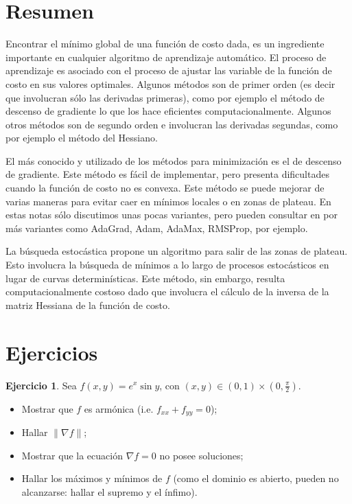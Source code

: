 \documentclass[12pt, a4paper]{amsbook}
\theoremstyle{remark}
\theoremstyle{definition}
\newtheorem{ejer}[teo]{Ejercicio}
\numberwithin{section}{chapter}
\numberwithin{subsection}{section}
\numberwithin{equation}{section}
\numberwithin{figure}{chapter}
\begin{document}
\section{Resumen}\label{sec.c4.4}

Encontrar el mínimo global de una función de costo dada, es un ingrediente importante en cualquier algoritmo de aprendizaje automático. El proceso de aprendizaje es asociado con el proceso de ajustar las variable de la función de costo en sus valores optimales. Algunos métodos son de primer orden (es decir que involucran sólo las derivadas primeras), como por ejemplo el método de descenso de gradiente lo que los hace eficientes computacionalmente. Algunos otros métodos son de segundo orden e involucran las derivadas segundas, como por ejemplo el método del Hessiano.

El más conocido y utilizado de los métodos para minimización es el de descenso de gradiente. Este método es fácil de implementar, pero presenta dificultades cuando la función de costo no es convexa. Este método se puede mejorar de varias maneras para evitar caer en mínimos locales o en zonas de plateau. En estas notas sólo discutimos unas pocas variantes, pero pueden consultar en \cite{Calin} por más variantes como AdaGrad, Adam, AdaMax, RMSProp, por ejemplo.

La búsqueda estocástica propone un algoritmo para salir de las zonas de plateau. Esto involucra la búsqueda de mínimos a lo largo de procesos estocásticos en lugar de curvas determinísticas. Este método, sin embargo, resulta computacionalmente costoso dado que involucra el cálculo de la inversa de la matriz Hessiana de la función de costo.

\section{Ejercicios}\label{sec.c4.5}

\begin{ejer}
Sea $f(x, y) = e^x\sin y$, con $(x, y)\in (0,1)\times (0,\tfrac{\pi}{2})$.
\begin{itemize}
\item[(a)] Mostrar que $f$ es armónica (i.e. $f_{xx} + f_{yy} = 0$);

\item[(b)] Hallar $\|\nabla f\|$;

\item[(c)] Mostrar que la ecuación $\nabla f=0$ no posee soluciones;

\item[(d)] Hallar los máximos y mínimos de $f$ (como el dominio es abierto, pueden no alcanzarse: hallar el supremo y el ínfimo).
\end{itemize}
\end{ejer}
\end{document}
